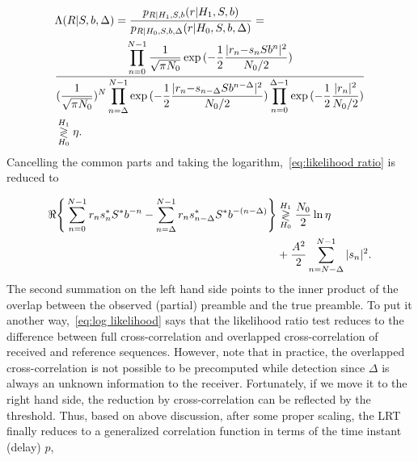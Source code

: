 \begin{equation}
    \label{eq:likelihood ratio}
    \begin{aligned}
    &\Lambda(R|S,b,\Delta)=\frac{p_{R|H_1,S,b}(r|H_1,S,b)}{p_{R|H_0,S,b,\Delta}(r|H_0,S,b,\Delta)}= \\
    &\frac{\displaystyle \prod_{n=0}^{N-1}\frac{1}{\sqrt{\pi N_0}}\exp{(-\frac{1}{2}\frac{|r_{n}{-}s_nSb^n|^2}{N_0/2})}}
    {(\displaystyle \frac{1}{\sqrt{\pi N_0}})^N\displaystyle \prod_{n=\Delta}^{N-1}\exp{(-\frac{1}{2}\frac{|r_{n}{-}s_{n-\Delta}Sb^{n-\Delta}|^2}{N_0/2})} 
    \displaystyle \prod_{n=0}^{\Delta-1}\exp{(-\frac{1}{2}\frac{|r_n|^2}{N_0/2})}} \\
    &\mathrel{\mathop\gtrless\limits^{H_1}_{H_0}} \eta.
    \end{aligned}
\end{equation}
Cancelling the common parts and taking the logarithm,~\eqref{eq:likelihood ratio} is reduced to

\begin{equation}
    \label{eq:log likelihood}
    \begin{aligned}
    \Re\Bigg\{\sum_{n=0}^{N-1}r_{n}s^*_nS^*b^{-n}-
    \sum_{n=\Delta}^{N-1}r_{n}s^*_{n-\Delta}S^*b^{-(n-\Delta)}\Bigg\}
    &\mathrel{\mathop\gtrless\limits^{H_1}_{H_0}} \frac{N_0}{2}\ln\eta \\
    &+\frac{A^2}{2}\sum_{n=N-\Delta}^{N-1}|s_n|^2.
    \end{aligned}
\end{equation}
The second summation on the left hand side points to the inner product of the overlap between
the observed (partial) preamble and the true preamble. 
To put it another way,~\eqref{eq:log likelihood} says that the likelihood 
ratio test reduces to the difference between full cross-correlation and overlapped cross-correlation
of received and reference sequences. However, note that in practice, the overlapped cross-correlation is not possible to be
precomputed while detection since $\Delta$ is always an unknown information to the receiver.
Fortunately, if we move it to the right hand side, the reduction by cross-correlation can be reflected by the threshold.
Thus, based on above discussion, after some proper scaling, the LRT finally reduces to a generalized correlation function in terms of the time instant (delay) $p$,

